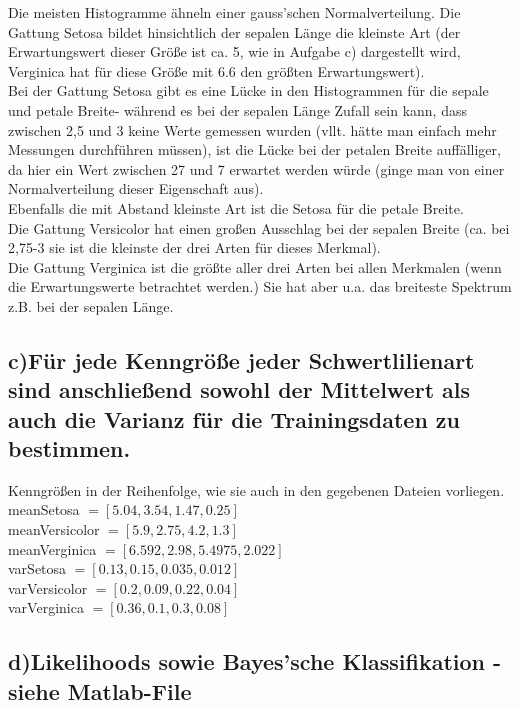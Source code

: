 \documentclass{scrartcl}
\begin{document}
Die meisten Histogramme ähneln einer gauss'schen Normalverteilung.
Die Gattung Setosa bildet hinsichtlich der sepalen Länge die kleinste Art (der Erwartungswert dieser Größe ist ca. 5, wie in Aufgabe c) dargestellt wird, Verginica hat für diese Größe mit 6.6 den größten Erwartungswert). \\
Bei der Gattung Setosa gibt es eine Lücke in den Histogrammen für die sepale und petale Breite- während es bei der sepalen Länge Zufall sein kann, dass zwischen 2,5 und 3 keine Werte gemessen wurden (vllt. hätte man einfach mehr Messungen durchführen müssen), ist die Lücke bei der petalen Breite auffälliger, da hier ein Wert zwischen 27 und 7 erwartet werden würde (ginge man von einer Normalverteilung dieser Eigenschaft aus).\\
Ebenfalls die mit Abstand kleinste Art ist die Setosa für die petale Breite.\\
Die Gattung Versicolor hat einen großen Ausschlag bei der sepalen Breite (ca. bei 2,75-3 sie ist die kleinste der drei Arten für dieses Merkmal). \\
Die Gattung Verginica ist die größte aller drei Arten bei allen Merkmalen (wenn die Erwartungswerte betrachtet werden.) Sie hat aber u.a. das breiteste Spektrum z.B. bei der sepalen Länge. 

\subsection*{c)Für jede Kenngröße jeder Schwertlilienart sind anschließend sowohl der Mittelwert als auch die Varianz	für die Trainingsdaten zu bestimmen.}

Kenngrößen in der Reihenfolge, wie sie auch in den gegebenen Dateien vorliegen.\\

meanSetosa $ = [5.04, 3.54, 1.47, 0.25]$ \\
meanVersicolor  $ = [5.9, 2.75,	4.2, 1.3]$ \\
meanVerginica $ = [6.592, 2.98, 	5.4975, 2.022]$ \\ 

varSetosa $ = [0.13,	0.15,	0.035,	0.012]$ \\
varVersicolor $ = [0.2, 0.09, 0.22, 0.04]$\\
varVerginica $ = [0.36, 0.1, 0.3, 0.08]$ \\
\subsection*{d)Likelihoods sowie Bayes'sche Klassifikation - siehe Matlab-File}
\end{document}
